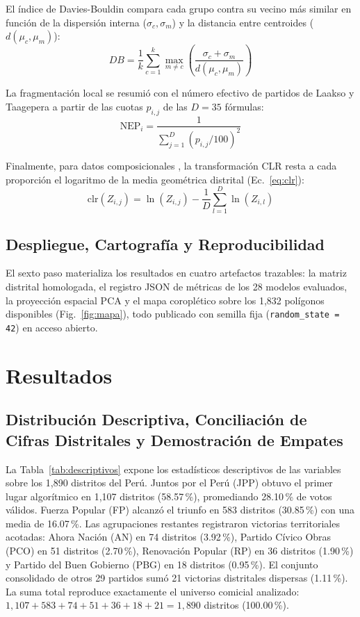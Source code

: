 \documentclass[conference,10pt,letterpaper]{IEEEtran}
\begin{document}
El índice de Davies-Bouldin \cite{davies1979} compara cada grupo contra su vecino más similar en función de la dispersión interna ($\sigma_c, \sigma_m$) y la distancia entre centroides ($d(\mu_c, \mu_m)$):
\begin{equation}
DB = \frac{1}{k} \sum_{c=1}^{k} \max_{m \neq c} \left( \frac{\sigma_c + \sigma_m}{d(\mu_c, \mu_m)} \right)
\label{eq:db}
\end{equation}

La fragmentación local se resumió con el número efectivo de partidos de Laakso y Taagepera a partir de las cuotas $p_{i,j}$ de las $D = 35$ fórmulas:
\begin{equation}
\mathrm{NEP}_i = \frac{1}{\sum_{j=1}^{D} (p_{i,j} / 100)^2}
\label{eq:nep}
\end{equation}

Finalmente, para datos composicionales \cite{greenacre2021}, la transformación CLR resta a cada proporción el logaritmo de la media geométrica distrital (Ec.~\ref{eq:clr}):
\begin{equation}
\mathrm{clr}(Z_{i,j}) = \ln(Z_{i,j}) - \frac{1}{D} \sum_{l=1}^{D} \ln(Z_{i,l})
\label{eq:clr}
\end{equation}

\subsection{Despliegue, Cartografía y Reproducibilidad}

El sexto paso materializa los resultados en cuatro artefactos trazables: la matriz distrital homologada, el registro JSON de métricas de los 28 modelos evaluados, la proyección espacial PCA y el mapa coroplético sobre los 1,832 polígonos disponibles (Fig.~\ref{fig:mapa}), todo publicado con semilla fija (\texttt{random\_state = 42}) en acceso abierto.

\section{Resultados}

\subsection{Distribución Descriptiva, Conciliación de Cifras Distritales y Demostración de Empates}

La Tabla~\ref{tab:descriptivos} expone los estadísticos descriptivos de las variables sobre los 1,890 distritos del Perú. Juntos por el Perú (JPP) obtuvo el primer lugar algorítmico en 1,107 distritos (58.57\,\%), promediando 28.10\,\% de votos válidos. Fuerza Popular (FP) alcanzó el triunfo en 583 distritos (30.85\,\%) con una media de 16.07\,\%. Las agrupaciones restantes registraron victorias territoriales acotadas: Ahora Nación (AN) en 74 distritos (3.92\,\%), Partido Cívico Obras (PCO) en 51 distritos (2.70\,\%), Renovación Popular (RP) en 36 distritos (1.90\,\%) y Partido del Buen Gobierno (PBG) en 18 distritos (0.95\,\%). El conjunto consolidado de otros 29 partidos sumó 21 victorias distritales dispersas (1.11\,\%). La suma total reproduce exactamente el universo comicial analizado: $1{,}107 + 583 + 74 + 51 + 36 + 18 + 21 = 1{,}890$ distritos (100.00\,\%).
\end{document}
